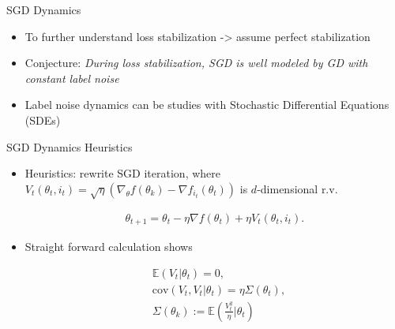 \documentclass[fleqn]{beamer}
\begin{document}
    \begin{frame}{SGD Dynamics}
        \begin{itemize}[<+->]
            \item To further understand loss stabilization -> assume perfect
                stabilization
            \item Conjecture: \textit{During loss stabilization, SGD is well
                modeled by GD with constant label noise}

            \item Label noise dynamics can be studies with Stochastic
                Differential Equations (SDEs)
        \end{itemize}

    \end{frame}

    \begin{frame}{SGD Dynamics Heuristics}
        \begin{itemize}[<+->]
            \item Heuristics: rewrite SGD iteration, where $V_t(\theta_t, i_t) =
                \sqrt{\eta}\left(\nabla_\theta f(\theta_k) - \nabla
                f_{i_t}(\theta_t)  \right)  $ is $d$-dimensional r.v.
            \begin{center}
            \begin{minipage}{0.5\textwidth}
                \begin{align*}
                    \theta_{t+1} = \theta_t - \eta \nabla f(\theta_t) + \eta
                    V_t(\theta_t, i_t).
                \end{align*}
            \end{minipage}
            \end{center}

        \item Straight forward calculation shows
            \begin{center}
            \begin{minipage}{0.5\textwidth}
                \begin{align*}
                    &\mathbb{E}(V_t|\theta_t) = 0, \\
                    &\text{cov}(V_t, V_t|\theta_t) = \eta \Sigma(\theta_t), \\
                    &\Sigma(\theta_k) :=
                    \mathbb{E}\left(\frac{V_t^{2}}{\eta}\Big|\theta_t \right)
                \end{align*}
            \end{minipage}
            \end{center}
        \end{itemize}
    \end{frame}
\end{document}
